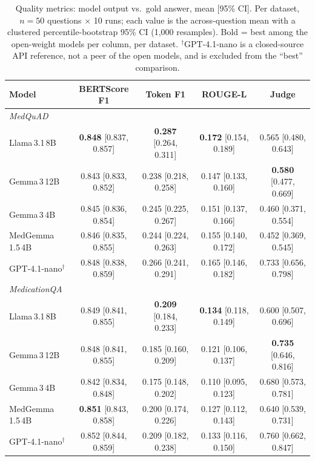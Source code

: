 \documentclass[11pt]{article}
\providecommand{\DIFaddbegin}{} %
\providecommand{\DIFaddend}{} %
\providecommand{\DIFdelend}{} %
\providecommand{\DIFaddincludegraphics}[2][]{{\color{blue}\fbox{\DIFOincludegraphics[#1]{#2}}}} %
\DeclareRobustCommand{\DIFaddbegin}{\DIFOaddbegin \let\includegraphics\DIFaddincludegraphics} %
\DeclareRobustCommand{\DIFaddend}{\DIFOaddend \let\includegraphics\DIFOincludegraphics} %
\DeclareRobustCommand{\DIFdelend}{\DIFOaddend \let\includegraphics\DIFOincludegraphics} %
\begin{document}
\DIFdelend \DIFaddbegin \begin{table}[h]
\centering
\caption{Quality metrics: model output vs.\ gold answer, mean [95\% CI].
Per dataset, $n{=}50$ questions $\times$ 10 runs; each value is the
across-question mean with a clustered percentile-bootstrap 95\% CI
(1{,}000 resamples). Bold = best among the open-weight models per column,
per dataset. $^\dagger$GPT-4.1-nano is a closed-source API reference, not a
peer of the open models, and is excluded from the ``best'' comparison.}
\label{tab:quality}
\footnotesize
\begin{tabular}{lcccc}
\toprule
\textbf{Model} & \textbf{BERTScore F1} & \textbf{Token F1} & \textbf{ROUGE-L} & \textbf{Judge} \\
\midrule
\multicolumn{5}{l}{\emph{MedQuAD}}\\
Llama\,3.1\,8B      & \textbf{0.848} [0.837, 0.857] & \textbf{0.287} [0.264, 0.311] & \textbf{0.172} [0.154, 0.189] & 0.565 [0.480, 0.643] \\
Gemma\,3\,12B       & 0.843 [0.833, 0.852] & 0.238 [0.218, 0.258] & 0.147 [0.133, 0.160] & \textbf{0.580} [0.477, 0.669] \\
Gemma\,3\,4B        & 0.845 [0.836, 0.854] & 0.245 [0.225, 0.267] & 0.151 [0.137, 0.166] & 0.460 [0.371, 0.554] \\
MedGemma\,1.5\,4B   & 0.846 [0.835, 0.855] & 0.244 [0.224, 0.263] & 0.155 [0.140, 0.172] & 0.452 [0.369, 0.545] \\
GPT-4.1-nano$^\dagger$ & 0.848 [0.838, 0.859] & 0.266 [0.241, 0.291] & 0.165 [0.146, 0.182] & 0.733 [0.656, 0.798] \\
\midrule
\multicolumn{5}{l}{\emph{MedicationQA}}\\
Llama\,3.1\,8B      & 0.849 [0.841, 0.855] & \textbf{0.209} [0.184, 0.233] & \textbf{0.134} [0.118, 0.149] & 0.600 [0.507, 0.696] \\
Gemma\,3\,12B       & 0.848 [0.841, 0.855] & 0.185 [0.160, 0.209] & 0.121 [0.106, 0.137] & \textbf{0.735} [0.646, 0.816] \\
Gemma\,3\,4B        & 0.842 [0.834, 0.848] & 0.175 [0.148, 0.202] & 0.110 [0.095, 0.123] & 0.680 [0.573, 0.781] \\
MedGemma\,1.5\,4B   & \textbf{0.851} [0.843, 0.858] & 0.200 [0.174, 0.226] & 0.127 [0.112, 0.143] & 0.640 [0.539, 0.731] \\
GPT-4.1-nano$^\dagger$ & 0.852 [0.844, 0.859] & 0.209 [0.182, 0.238] & 0.133 [0.116, 0.150] & 0.760 [0.662, 0.847] \\
\bottomrule
\end{tabular}
\end{table}
\DIFaddend 
\end{document}
